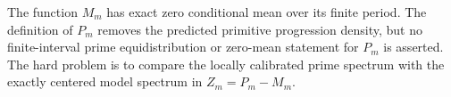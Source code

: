 \begin{remark}
The function \(M_m\) has exact zero conditional mean over its finite
period.  The definition of \(P_m\) removes the predicted primitive
progression density, but no finite-interval prime equidistribution or
zero-mean statement for \(P_m\) is asserted.  The hard problem is to
compare the locally calibrated prime spectrum with the exactly
centered model spectrum in \(Z_m=P_m-M_m\).
\end{remark}
